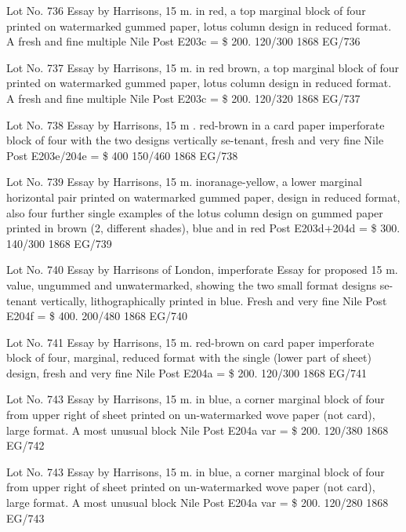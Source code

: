 \documentclass[justified]{tufte-book}
\begin{document}
%
{Lot No. 736
Essay by Harrisons, 15 m. in red, a top marginal block of four printed on watermarked gummed paper, lotus column design in reduced format. A fresh and fine multiple Nile Post E203c = \$ 200. 120/300
}%
{1868}%
{EG/736}%
{}%
{}
{}%
{}

%
{Lot No. 737
Essay by Harrisons, 15 m. in red brown, a top marginal block of four printed on watermarked gummed paper, lotus column design in reduced format. A fresh and fine multiple Nile Post E203c = \$ 200. 120/320
}%
{1868}%
{EG/737}%
{}%
{}
{}%
{}


%
{
Lot No. 738
Essay by Harrisons, 15 m . red-brown in a card paper imperforate block of four with the two designs vertically se-tenant, fresh and very fine Nile Post E203e/204e = \$ 400 150/460
}%
{1868}%
{EG/738}%
{}%
{}
{}%
{}

%
{Lot No. 739
Essay by Harrisons, 15 m. inoranage-yellow, a lower marginal horizontal pair printed on watermarked gummed paper, design in reduced format, also four further single examples of the lotus column design on gummed paper printed in brown (2, different shades), blue and in red Post E203d+204d = \$ 300. 140/300
}%
{1868}%
{EG/739}%
{}%
{}
{}%
{}

%
{Lot No. 740
Essay by Harrisons of London, imperforate Essay for proposed 15 m. value, ungummed and unwatermarked, showing the two small format designs se-tenant vertically, lithographically printed in blue. Fresh and very fine Nile Post E204f = \$ 400. 200/480
}%
{1868}%
{EG/740}%
{}%
{}
{}%
{}


%
{Lot No. 741
Essay by Harrisons, 15 m. red-brown on card paper imperforate block of four, marginal, reduced format with the single (lower part of sheet) design, fresh and very fine Nile Post E204a = \$ 200. 120/300
}%
{1868}%
{EG/741}%
{}%
{}
{}%
{}

%
{Lot No. 743
Essay by Harrisons, 15 m. in blue, a corner marginal block of four from upper right of sheet printed on un-watermarked wove paper (not card), large format. A most unusual block Nile Post E204a var = \$ 200. 120/380
}%
{1868}%
{EG/742}%
{}%
{}
{}%
{}

%
{Lot No. 743
Essay by Harrisons, 15 m. in blue, a corner marginal block of four from upper right of sheet printed on un-watermarked wove paper (not card), large format. A most unusual block Nile Post E204a var = \$ 200. 120/280
}%
{1868}%
{EG/743}%
{}%
{}
{}%
{}
\end{document}
